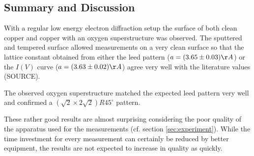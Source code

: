 \documentclass[a4paper]{scrartcl}
\numberwithin{equation}{section}
\numberwithin{figure}{section}
\numberwithin{table}{section}
\begin{document}
\subsection{Summary and Discussion}
With a regular low energy electron diffraction setup the surface of both clean copper and copper with an oxygen superstructure was observed. The sputtered and tempered surface allowed measurements on a very clean surface so that the lattice constant obtained from either the leed pattern ($a=(3.65\pm0.03)\AA$) or the $I(V)$ curve ($a=(3.63\pm0.02)\AA$) agree very well with the literature values (SOURCE). %

The observed oxygen superstructure matched the expected leed pattern very well and confirmed a $(\sqrt{2} \times 2\sqrt{2})R45^\circ$ pattern.

These rather good results are almost surprising considering the poor quality of the apparatus used for the measurements (cf. section \ref{sec:experiment}). While the time investment for every measurement can certainly be reduced by better equipment, the results are not expected to increase in quality as quickly.

 

\end{document}

